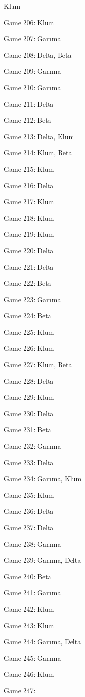 \documentclass{article}
\begin{document}
\begin{multicols}{3}
\begin{compactitem}
Klum
\item Game 206:
Klum
\item Game 207:
Gamma
\item Game 208:
Delta, Beta
\item Game 209:
Gamma
\item Game 210:
Gamma
\item Game 211:
Delta
\item Game 212:
Beta
\item Game 213:
Delta, Klum
\item Game 214:
Klum, Beta
\item Game 215:
Klum
\item Game 216:
Delta
\item Game 217:
Klum
\item Game 218:
Klum
\item Game 219:
Klum
\item Game 220:
Delta
\item Game 221:
Delta
\item Game 222:
Beta
\item Game 223:
Gamma
\item Game 224:
Beta
\item Game 225:
Klum
\item Game 226:
Klum
\item Game 227:
Klum, Beta
\item Game 228:
Delta
\item Game 229:
Klum
\item Game 230:
Delta
\item Game 231:
Beta
\item Game 232:
Gamma
\item Game 233:
Delta
\item Game 234:
Gamma, Klum
\item Game 235:
Klum
\item Game 236:
Delta
\item Game 237:
Delta
\item Game 238:
Gamma
\item Game 239:
Gamma, Delta
\item Game 240:
Beta
\item Game 241:
Gamma
\item Game 242:
Klum
\item Game 243:
Klum
\item Game 244:
Gamma, Delta
\item Game 245:
Gamma
\item Game 246:
Klum
\item Game 247:

\end{compactitem}
\end{multicols}
\end{document}
